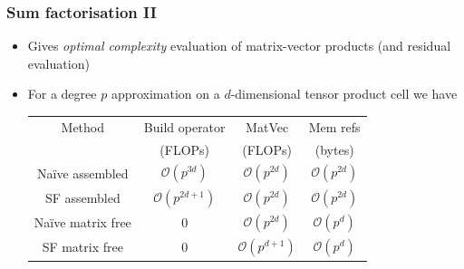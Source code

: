 \documentclass[presentation]{beamer}
\begin{document}
\begin{frame}
  \frametitle{Sum factorisation II}
  \begin{itemize}
  \item Gives \emph{optimal complexity} evaluation of
    matrix-vector products (and residual evaluation)
  \item For a degree $p$ approximation on a $d$-dimensional tensor
    product cell we have

    \begin{tabular}{c|c|c|c}
      Method              & Build operator            & MatVec                 & Mem refs              \\
                          & (FLOPs)                   & (FLOPs)                & (bytes)               \\
      \hline

      Na\"ive assembled   & $\mathcal{O}(p^{3d})$     & $\mathcal{O}(p^{2d})$  & $\mathcal{O}(p^{2d})$ \\ 
      SF assembled        & $\mathcal{O}(p^{2d + 1})$ & $\mathcal{O}(p^{2d})$  & $\mathcal{O}(p^{2d})$ \\
      Na\"ive matrix free & 0                         & $\mathcal{O}(p^{2d})$  & $\mathcal{O}(p^d)$    \\
      SF matrix free      & 0                         & $\mathcal{O}(p^{d+1})$ & $\mathcal{O}(p^d)$    \\
    \end{tabular}
  \end{itemize}
\end{frame}
\end{document}
